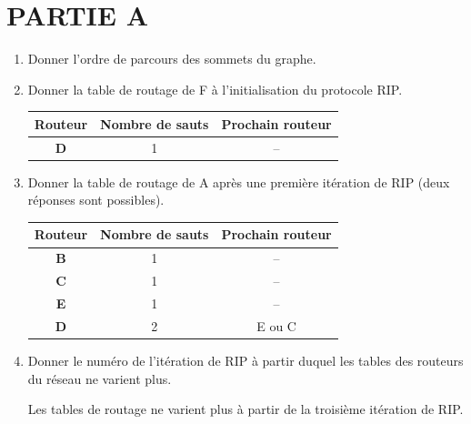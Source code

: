 
\pagestyle{DS_FP}

\bigskip


\section*{PARTIE A}

\begin{enumerate}[series=monDS]
    \item Donner l'ordre de parcours des sommets du graphe.\hfill {}

    \item Donner la table de routage de F à l’initialisation du protocole RIP.

    \begin{blocvisible}[height=1.5]

\begin{center}
\begin{tabular}{|c|c|c|}
\hline
\textbf{Routeur} & \textbf{Nombre de sauts} & \textbf{Prochain routeur} \\
\hline
\textbf{D} & 1 & -- \\
\hline
\end{tabular}
\end{center}
\end{blocvisible}


    \item Donner la table de routage de A après une première itération de RIP (deux réponses sont possibles).
    
     \begin{blocvisible}[height=3.]

\begin{center}
\begin{tabular}{|c|c|c|}
\hline
\textbf{Routeur} & \textbf{Nombre de sauts} & \textbf{Prochain routeur} \\
\hline
\textbf{B} & 1 & -- \\
\hline
\textbf{C} & 1 & -- \\
\hline
\textbf{E} & 1 & -- \\
\hline
\textbf{D} & 2 & E ou C \\
\hline
\end{tabular}
\end{center}
\end{blocvisible}
    \item Donner le numéro de l’itération de RIP à partir duquel les tables des routeurs du réseau ne varient plus. \hfill 
\begin{blocvisible}[height=1]
    Les tables de routage ne varient plus à partir de la troisième itération de RIP.


\end{blocvisible}
\end{enumerate}
